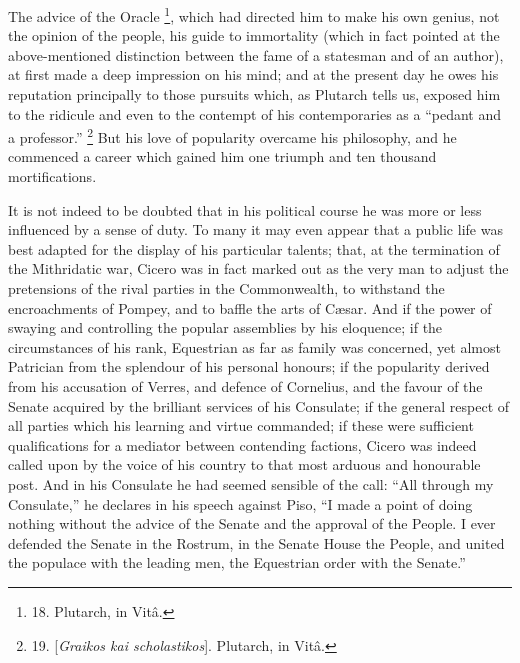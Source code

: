 The advice of the Oracle \footnote{18. Plutarch, in
Vitâ.}, which had directed him to make his own genius, not the
opinion of the people, his guide to immortality (which in fact pointed
at the above-mentioned distinction between the fame of a statesman and
of an author), at first made a deep impression on his mind; and at the
present day he owes his reputation principally to those pursuits
which, as Plutarch tells us, exposed him to the ridicule and even to
the contempt of his contemporaries as a ``pedant and a professor.'' \footnote{19. [\emph{Graikos kai
scholastikos}]. Plutarch, in Vitâ.} But his love of popularity overcame his philosophy, and he
commenced a career which gained him one triumph and ten thousand
mortifications.

It is not indeed to be doubted
that in his political course he was more or less influenced by a sense
of duty. To many it may even appear that a public life was best
adapted for the display of his particular talents; that, at the
termination of the Mithridatic war, Cicero was in fact marked out as
the very man to adjust the pretensions of the rival parties in the
Commonwealth, to withstand the encroachments of Pompey, and to baffle
the arts of Cæsar. And if the power of swaying and controlling the
popular assemblies by his eloquence; if the circumstances of his rank,
Equestrian as far as family was concerned, yet almost Patrician from
the splendour of his personal honours; if the popularity derived
from his accusation of Verres, and defence of Cornelius, and the
favour of the Senate acquired by the brilliant services of his
Consulate; if the general respect of all parties which his learning
and virtue commanded; if these were sufficient qualifications for a
mediator between contending factions, Cicero was indeed called upon by
the voice of his country to that most arduous and honourable post. And
in his Consulate he had seemed sensible of the call: ``All through my
Consulate,'' he declares in his speech against Piso, ``I made a point of
doing nothing without the advice of the Senate and the approval of the
People. I ever defended the Senate in the Rostrum, in the Senate House
the People, and united the populace with the leading men, the
Equestrian order with the Senate.''

